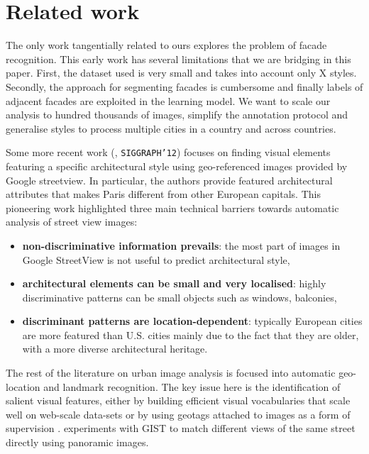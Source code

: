 \documentclass[runningheads, table]{llncs}
\begin{document}
\section{Related work}

The only work tangentially related to ours  \cite{mathias2011automatic} explores  the problem of facade recognition. This early work has several limitations that we are bridging in this paper. First, the dataset used is very small and takes into account only X styles. Secondly, the approach for segmenting facades is cumbersome and finally labels of adjacent facades are exploited in the learning model. We want to  scale our analysis to hundred thousands of images, simplify the annotation protocol and generalise styles to process multiple cities in a country and across countries. 

Some more recent work (\cite{doersch2012what}, \texttt{SIGGRAPH'12}) focuses on finding visual elements featuring a specific architectural style using geo-referenced images provided by Google streetview. In particular, the authors provide featured architectural attributes that makes Paris different from other European capitals.
This pioneering work highlighted three main technical barriers towards automatic analysis of street view images: 

\begin{itemize}
\item \textbf{non-discriminative information prevails}: the most part of images in Google StreetView is not useful to predict architectural style, 
\item \textbf{architectural elements can be small and very localised}: highly discriminative patterns can be small objects such as windows, balconies,
\item \textbf{discriminant patterns are location-dependent}: typically European cities are more featured than U.S. cities mainly due to the fact that they are older, with a more diverse architectural heritage.  
\end{itemize}

The rest of the literature on urban image analysis \cite{SBS07,knopp2010avoiding,li2009landmark} is  focused into automatic geo-location and landmark recognition. The key issue here is the identification of salient visual features, either by building efficient visual vocabularies that scale well on web-scale data-sets \cite{SBS07} or by using geotags attached to  images as a form of supervision \cite{knopp2010avoiding}. \cite{murillo2009experiments} experiments with GIST to match different views of the same street directly using panoramic images.
\end{document}
